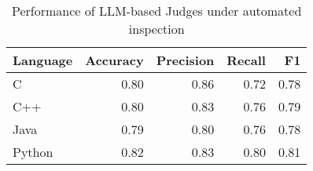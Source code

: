 \begin{table}[!t]
  \centering
  \caption{Performance of LLM-based Judges under automated inspection}
    \begin{tabular}{lrrrr}
    \toprule
     Language & Accuracy & Precision & Recall & F1 \\
    \midrule
    C     & 0.80 &  0.86 &  0.72 & 0.78 \\
    C++   & 0.80 &  0.83 &  0.76 & 0.79 \\
    Java  & 0.79 &  0.80 &  0.76 & 0.78 \\
    Python & 0.82  & 0.83 & 0.80 & 0.81 \\
    \bottomrule
    \end{tabular}%
  \label{tab:dis_judge_auto}%
\end{table}%